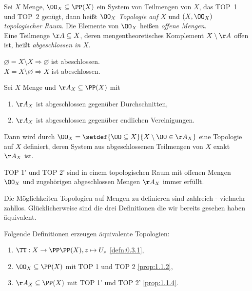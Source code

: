 \begin{defnn}
Sei $X$ Menge, $\OO_X\subseteq \PP(X)$ ein System von Teilmengen von $X$, das
TOP~1 und TOP~2 genügt, dann heißt $\OO_X$ \emph{Topologie auf $X$} und
\emph{$(X,\OO_X)$ topologischer Raum}. Die Elemente von $\OO_X$ heißen
\emph{offene Mengen}.\\
Eine Teilmenge $\AA\subseteq X$, deren mengentheoretisches Komplement
$X\setminus \AA$ offen ist, heißt
\emph{abgeschlossen in $X$}.\fishhere
\end{defnn}

\begin{bemn}
$\varnothing = X\setminus X \Rightarrow \varnothing$ ist abeschlossen.\\
$X = X\setminus \varnothing \Rightarrow X$ ist abeschlossen.\maphere
\end{bemn}

\begin{prop}
\label{prop:1.1.4}
Sei $X$ Menge und $\AA_X\subseteq \PP(X)$ mit
\begin{enumerate}[label=TOP \arabic{*}']
  \item $\AA_X$ ist abgeschlossen gegenüber Durchschnitten,
  \item $\AA_X$ ist abgeschlossen gegenüber endlichen Vereinigungen.
\end{enumerate}
Dann wird durch $\OO_X = \setdef{\OO\subseteq X}{X\setminus \OO\in \AA_X}$ eine
Topologie auf $X$ definiert, deren System aus abgeschlossenen Teilmengen von $X$
exakt $\AA_X$ ist.

TOP 1' und TOP 2' sind in einem topologischen Raum mit offenen Mengen $\OO_X$
und zugehörigen abgeschlossen Mengen $\AA_X$ immer erfüllt.\fishhere
\end{prop}

Die Möglichkeiten Topologien auf Mengen zu definieren sind zahlreich - vielmehr
zahllos. Glücklicherweise sind die drei Definitionen die wir bereits gesehen
haben äquivalent.

\begin{prop}
\label{prop:1.1.5}
Folgende Definitionen erzeugen äquivalente Topologien:
\begin{enumerate}
  \item $\TT: X\to\PP\PP(X), z\mapsto U_z$ \ref{defn:0.3.1},
  \item $\OO_X\subseteq \PP(X)$ mit TOP 1 und TOP 2 \ref{prop:1.1.2},
  \item $\AA_X \subseteq \PP(X)$ mit TOP 1' und TOP 2'
  \ref{prop:1.1.4}.\fishhere
\end{enumerate}
\end{prop}

